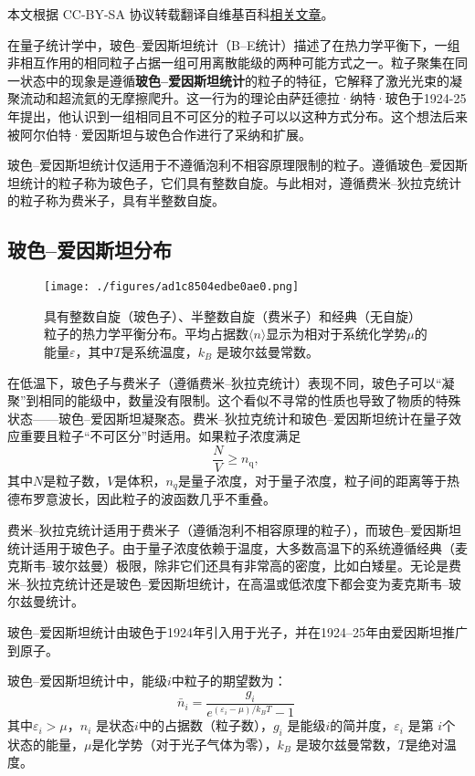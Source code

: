 
本文根据 CC-BY-SA 协议转载翻译自维基百科\href{https://en.wikipedia.org/wiki/Bose\%E2\%80\%93Einstein_statistics}{相关文章}。

在量子统计学中，玻色–爱因斯坦统计（B–E统计）描述了在热力学平衡下，一组非相互作用的相同粒子占据一组可用离散能级的两种可能方式之一。粒子聚集在同一状态中的现象是遵循\textbf{玻色–爱因斯坦统计}的粒子的特征，它解释了激光光束的凝聚流动和超流氦的无摩擦爬升。这一行为的理论由萨廷德拉·纳特·玻色于1924-25年提出，他认识到一组相同且不可区分的粒子可以以这种方式分布。这个想法后来被阿尔伯特·爱因斯坦与玻色合作进行了采纳和扩展。

玻色–爱因斯坦统计仅适用于不遵循泡利不相容原理限制的粒子。遵循玻色–爱因斯坦统计的粒子称为玻色子，它们具有整数自旋。与此相对，遵循费米–狄拉克统计的粒子称为费米子，具有半整数自旋。
\subsection{玻色–爱因斯坦分布}  
\begin{figure}[ht]
\centering
\texttt{[image: ./figures/ad1c8504edbe0ae0.png]}
\caption{具有整数自旋（玻色子）、半整数自旋（费米子）和经典（无自旋）粒子的热力学平衡分布。平均占据数\(\langle n \rangle \)显示为相对于系统化学势\( \mu \)的能量\(\varepsilon\)，其中\( T \)是系统温度，\( k_B \) 是玻尔兹曼常数。}\label{fig_BSAYST_1}
\end{figure}
在低温下，玻色子与费米子（遵循费米–狄拉克统计）表现不同，玻色子可以“凝聚”到相同的能级中，数量没有限制。这个看似不寻常的性质也导致了物质的特殊状态——玻色–爱因斯坦凝聚态。费米–狄拉克统计和玻色–爱因斯坦统计在量子效应重要且粒子“不可区分”时适用。如果粒子浓度满足
\[
\frac{N}{V} \geq n_{\text{q}},~
\]
其中\( N \)是粒子数，\( V \)是体积，\( n_q \)是量子浓度，对于量子浓度，粒子间的距离等于热德布罗意波长，因此粒子的波函数几乎不重叠。

费米–狄拉克统计适用于费米子（遵循泡利不相容原理的粒子），而玻色–爱因斯坦统计适用于玻色子。由于量子浓度依赖于温度，大多数高温下的系统遵循经典（麦克斯韦–玻尔兹曼）极限，除非它们还具有非常高的密度，比如白矮星。无论是费米–狄拉克统计还是玻色–爱因斯坦统计，在高温或低浓度下都会变为麦克斯韦–玻尔兹曼统计。

玻色–爱因斯坦统计由玻色于1924年引入用于光子，并在1924–25年由爱因斯坦推广到原子。

玻色–爱因斯坦统计中，能级\( i \)中粒子的期望数为：
\[
\bar{n}_i = \frac{g_i}{e^{(\varepsilon_i - \mu) / k_B T} - 1}~
\]
其中\( \varepsilon_i > \mu \)，\( n_i \) 是状态\( i \)中的占据数（粒子数），\( g_i \) 是能级\( i \)的简并度，\( \varepsilon_i \) 是第 \( i \)个状态的能量，\( \mu \)是化学势（对于光子气体为零），\( k_B \) 是玻尔兹曼常数，\( T \)是绝对温度。

